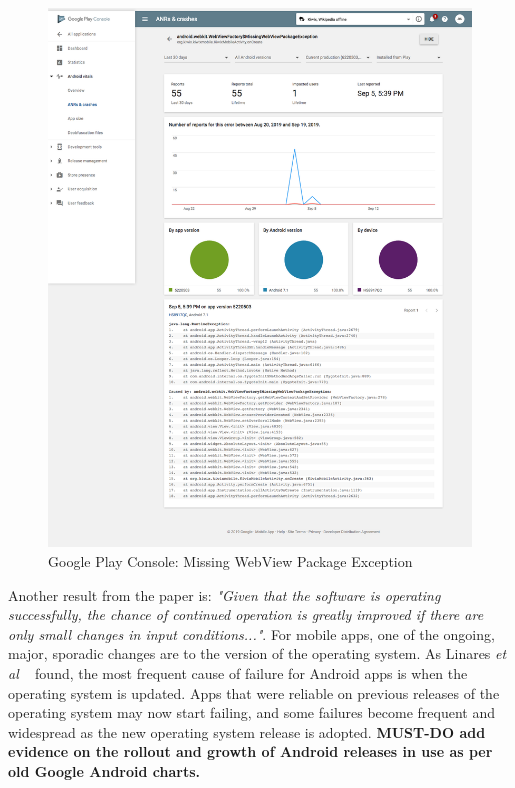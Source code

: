 \begin{figure}
    \centering
    \includegraphics[width=\linewidth]{images/android-vitals-screenshots/55-crashes-WebViewFactory-MissingWebViewPackageException Screenshot_2019-09-19-kiwix.png}
    \caption{Google Play Console: Missing WebView Package Exception}
    \label{fig:55-crashes-missing-webview-package-exception}
\end{figure}
\afterpage{\clearpage}

Another result from the paper is: \emph{"Given that the software is operating successfully, the chance of continued operation is greatly improved if there are only small changes in input conditions..."}. For mobile apps, one of the ongoing, major, sporadic changes are to the version of the operating system. As Linares \emph{et al} ~ found, the most frequent cause of failure for Android apps is when the operating system is updated. Apps that were reliable on previous releases of the operating system may now start failing, and some failures become frequent and widespread as the new operating system release is adopted. \textbf{MUST-DO add evidence on the rollout and growth of Android releases in use as per old Google Android charts.}
~

